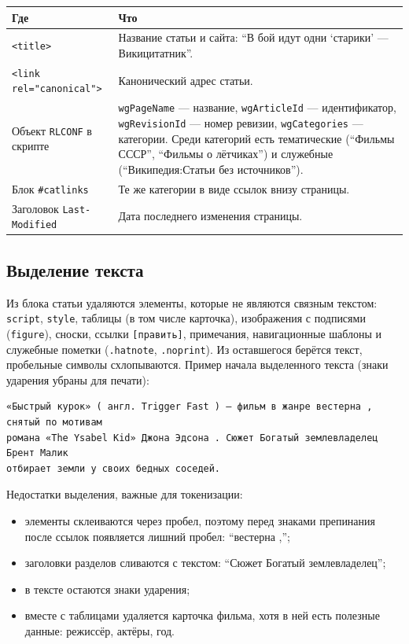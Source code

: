 \documentclass[12pt,a4paper,oneside,fleqn]{article}
\begin{document}
\begin{longtable}{|p{4.6cm}|p{10.4cm}|}
\hline
\textbf{Где} & \textbf{Что} \\
\hline
\texttt{<title>} & Название статьи и сайта: \enquote{В бой идут одни \enquote{старики} --- Викицитатник}. \\
\hline
\texttt{<link rel="canonical">} & Канонический адрес статьи. \\
\hline
Объект \texttt{RLCONF} в скрипте & \texttt{wgPageName} --- название, \texttt{wgArticleId} --- идентификатор, \texttt{wgRevisionId} --- номер ревизии, \texttt{wgCategories} --- категории. Среди категорий есть тематические (\enquote{Фильмы СССР}, \enquote{Фильмы о лётчиках}) и служебные (\enquote{Википедия:Статьи без источников}). \\
\hline
Блок \texttt{\#catlinks} & Те же категории в виде ссылок внизу страницы. \\
\hline
Заголовок \texttt{Last-Modified} & Дата последнего изменения страницы. \\
\hline
\end{longtable}

\subsection{Выделение текста}

Из блока статьи удаляются элементы, которые не являются связным текстом: \texttt{script}, \texttt{style}, таблицы (в том числе карточка), изображения с подписями (\texttt{figure}), сноски, ссылки \texttt{[править]}, примечания, навигационные шаблоны и служебные пометки (\texttt{.hatnote}, \texttt{.noprint}). Из оставшегося берётся текст, пробельные символы схлопываются. Пример начала выделенного текста (знаки ударения убраны для печати):

\begin{lstlisting}[style=plaintext]
«Быстрый курок» ( англ. Trigger Fast ) — фильм в жанре вестерна , снятый по мотивам
романа «The Ysabel Kid» Джона Эдсона . Сюжет Богатый землевладелец Брент Малик
отбирает земли у своих бедных соседей.
\end{lstlisting}

Недостатки выделения, важные для токенизации:
\begin{itemize}
    \item элементы склеиваются через пробел, поэтому перед знаками препинания после ссылок появляется лишний пробел: \enquote{вестерна ,};
    \item заголовки разделов сливаются с текстом: \enquote{Сюжет Богатый землевладелец};
    \item в тексте остаются знаки ударения;
    \item вместе с таблицами удаляется карточка фильма, хотя в ней есть полезные данные: режиссёр, актёры, год.
\end{itemize}
\end{document}
